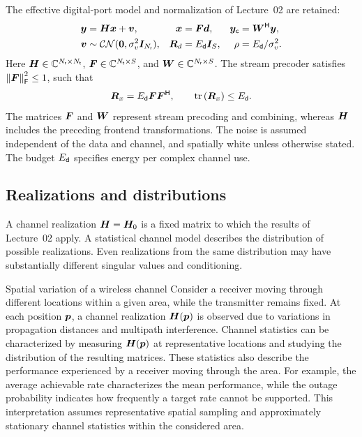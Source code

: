 The effective digital-port model and normalization of
Lecture~02 are retained:
\begin{align}
	\bm{y}&=\bm{H}\bm{x}+\bm{v},&
	\bm{x}&=\bm{F}\bm{d},&
	\bm{y}_{\mathsf c}&={\bm{W}}^{\mathsf{H}}\bm{y},
	\label{eq:model}\\
	\bm{v}&\sim\mathcal{CN}(\bm{0},\sigma_v^2\bm{I}_{N_{\mathsf{r}}}),&
	\bm{R}_d&=E_{\mathsf{d}}\bm{I}_{S},&
	\rho&=E_{\mathsf{d}}/\sigma_v^2.
	\nonumber
\end{align}
Here $\bm{H}\in\mathbb{C}^{N_{\mathsf{r}}\times N_{\mathsf{t}}}$,
$\bm{F}\in\mathbb{C}^{N_{\mathsf{t}}\times S}$, and
$\bm{W}\in\mathbb{C}^{N_{\mathsf{r}}\times S}$.
The stream precoder satisfies $\left\|\bm{F}\right\|_{\mathsf{F}}^2\leq1$,
such that
\begin{equation*}
	\bm{R}_x=E_{\mathsf{d}}\bm{F}{\bm{F}}^{\mathsf{H}},
	\qquad
	\operatorname{tr}\left(\bm{R}_x\right)\leq E_{\mathsf{d}}.
\end{equation*}
The matrices $\bm{F}$ and $\bm{W}$ represent stream
precoding and combining, whereas $\bm{H}$ includes
the preceding frontend transformations.
The noise is assumed independent of the data and
channel, and spatially white unless otherwise stated.
The budget $E_{\mathsf{d}}$ specifies energy per complex channel use.

\subsection{Realizations and distributions}

A channel realization $\bm{H}=\bm{H}_0$ is a fixed
matrix to which the results of Lecture~02 apply.
A statistical channel model describes the distribution
of possible realizations. Even realizations from the same
distribution may have substantially different singular
values and conditioning.

\begin{example}{Spatial variation of a wireless channel}
	Consider a receiver moving through different locations
	within a given area, while the transmitter remains fixed.
	At each position $\bm{p}$, a channel realization
	$\bm{H}(\bm{p})$ is observed due to variations in
	propagation distances and multipath interference.
	Channel statistics can be characterized by measuring
	$\bm{H}(\bm{p})$ at representative locations and
	studying the distribution of the resulting matrices.
	These statistics also describe the performance experienced
	by a receiver moving through the area. For example,
	the average achievable rate characterizes the mean
	performance, while the outage probability indicates
	how frequently a target rate cannot be supported.
	This interpretation assumes representative spatial sampling
	and approximately stationary channel statistics within
	the considered area.
\end{example}


